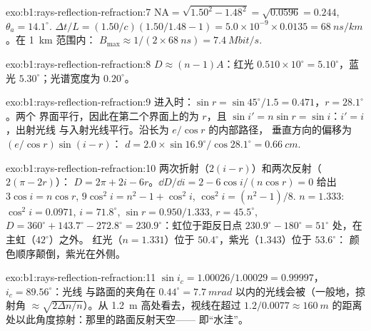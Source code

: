 \begin{solution}{exo:b1:rays-reflection-refraction:7}
$\mathrm{NA} = \sqrt{1.50^2 - 1.48^2} = \sqrt{0.0596} = 0.244$,
$\theta_a = 14.1^\circ$. $\Delta t/L = (1.50/c)(1.50/1.48 - 1) =
5.0\times10^{-9} \times 0.0135 = \qty{68}{ns/km}$。在 \qty{1}{km} 范围内：
$B_{\max} \approx 1/(2 \times \qty{68}{ns}) = \qty{7.4}{Mbit/s}$.
\end{solution}

\begin{solution}{exo:b1:rays-reflection-refraction:8}
$D \approx (n - 1)A$：红光 $0.510 \times 10^\circ = 5.10^\circ$，蓝光
$5.30^\circ$；光谱宽度为 $0.20^\circ$。
\end{solution}

\begin{solution}{exo:b1:rays-reflection-refraction:9}
进入时：$\sin r = \sin 45^\circ/1.5 = 0.471$，$r = 28.1^\circ$。两个
界面平行，因此在第二个界面上的为 $r$，且
$\sin i' = n\sin r = \sin i$：$i' = i$，出射光线
与入射光线平行。沿长为 $e/\cos r$ 的内部路径，
垂直方向的偏移为 $(e/\cos r)\sin(i - r)$：
$d = 2.0 \times \sin 16.9^\circ/\cos 28.1^\circ = \qty{0.66}{cm}$.
\end{solution}

\begin{solution}{exo:b1:rays-reflection-refraction:10}
两次折射（$2(i - r)$）和两次反射（$2(\pi - 2r)$）：
$D = 2\pi + 2i - 6r$。$\dd D/\dd i = 2 - 6\cos i/(n\cos r) = 0$ 给出
$3\cos i = n\cos r$, $9\cos^2 i = n^2 - 1 + \cos^2 i$, $\cos^2 i =
(n^2 - 1)/8$. $n = 1.333$: $\cos^2 i = 0.0971$, $i = 71.8^\circ$,
$\sin r = 0.950/1.333$, $r = 45.5^\circ$, $D = 360^\circ + 143.7^\circ -
272.8^\circ = 230.9^\circ$：虹位于距反日点 $230.9^\circ - 180^\circ =
51^\circ$ 处，在主虹（$42^\circ$）之外。
红光（$n = 1.331$）位于 $50.4^\circ$，紫光（$1.343$）位于 $53.6^\circ$：
颜色顺序颠倒，紫光在外侧。
\end{solution}

\begin{solution}{exo:b1:rays-reflection-refraction:11}
$\sin i_c = 1.00026/1.00029 = 0.99997$，$i_c = 89.56^\circ$：光线
与路面的夹角在 $0.44^\circ = \qty{7.7}{mrad}$ 以内的光线会被（一般地，掠射角 $\approx \sqrt{2\Delta n/n}$）。从
\qty{1.2}{m} 高处看去，视线在超过
$1.2/0.0077 \approx \qty{160}{m}$ 的距离处以此角度掠射：那里的路面反射天空——
即“水洼”。
\end{solution}


